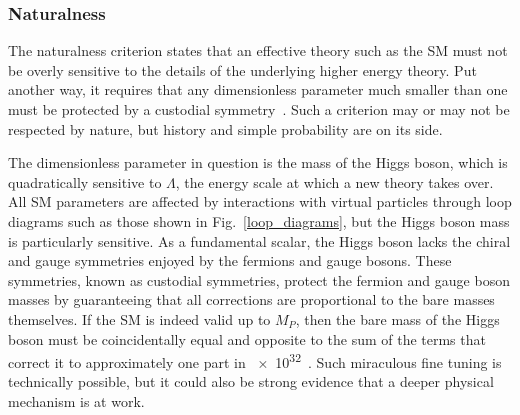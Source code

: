 \subsubsection{Naturalness}
The naturalness criterion states that an effective theory such as the SM must not be overly sensitive to the details of the underlying higher energy theory. Put another way, it requires that any dimensionless parameter much smaller than one must be protected by a custodial symmetry~\cite{thooft_naturalness}. Such a criterion may or may not be respected by nature, but history and simple probability are on its side.

The dimensionless parameter in question is the mass of the Higgs boson, which is quadratically sensitive to $\Lambda$, the energy scale at which a new theory takes over. All SM parameters are affected by interactions with virtual particles through loop diagrams such as those shown in Fig.~\ref{loop_diagrams}, but the Higgs boson mass is particularly sensitive. As a fundamental scalar, the Higgs boson lacks the chiral and gauge symmetries enjoyed by the fermions and gauge bosons. These symmetries, known as custodial symmetries, protect the fermion and gauge boson masses by guaranteeing that all corrections are proportional to the bare masses themselves. If the SM is indeed valid up to $M_{P}$, then the bare mass of the Higgs boson must be coincidentally equal and opposite to the sum of the terms that correct it to approximately one part in \num{e32}~\cite{giudice_naturalness_2008}. Such miraculous fine tuning is technically possible, but it could also be strong evidence that a deeper physical mechanism is at work.




\pagebreak